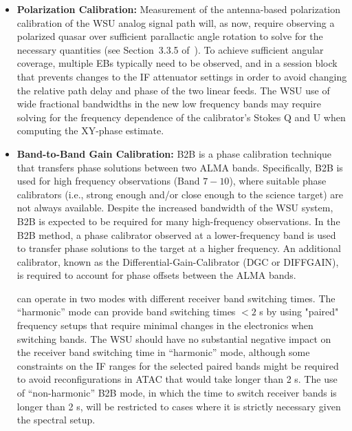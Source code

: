 \begin{itemize}[itemsep=-0.5em]
The flux service, which estimates the source flux density, spectral index and curvature at a time and frequency given the measurements, will continue to be an essential component of ALMA in the WSU. The resulting flux calibration will be linear with respect to the flux scaling to allow for the re-scaling of the fluxes for individual EBs prior to imaging, as necessary. This will allow the per-EB calibration to be run as close as possible to the time the data were acquired, later re-scaling the fluxes, if necessary, either because the  Source Catalogue values changed or to equalize the flux between EBs.
Spectral windows with wider fractional bandwidth enabled by the WSU will need improved treatment in the Pipeline of the spectral curvature of the grid calibrators, to  maintain the accuracy of the flux scale. 
\item{\bf Polarization Calibration:} Measurement of the antenna-based polarization calibration of the WSU analog signal path will, as now, require observing a polarized quasar over sufficient parallactic angle rotation to solve for the necessary quantities (see Section~3.3.5 of~\cite{CSA-IA}).  To achieve sufficient angular coverage, multiple EBs typically need to be observed, and in a session block that prevents changes to the IF attenuator settings in order to avoid changing the relative path delay and phase of the two linear feeds.  The WSU use of wide
fractional bandwidths in the new low frequency bands may require solving for the frequency dependence of the calibrator’s Stokes Q and U when computing the XY-phase estimate.
\item{\bf Band-to-Band Gain Calibration:} \ac{B2B} is a phase calibration technique that transfers phase solutions between two ALMA bands. Specifically, B2B is used for high frequency observations (Band $7-10$), where suitable phase calibrators (i.e., strong enough and/or close enough to the science target) are not always available. Despite the increased bandwidth of the WSU system, B2B is expected to be required for many high-frequency observations. In the B2B method, a phase calibrator observed at a lower-frequency band is used to transfer phase solutions to the target at a higher frequency.  An additional calibrator, known as the Differential-Gain-Calibrator (DGC or DIFFGAIN), is required to account for  phase offsets between the ALMA bands. 

 can operate in two modes with different receiver band switching times. The “harmonic” mode can provide band switching times $<2$ s by using "paired" frequency setups that require minimal changes in the electronics when switching bands. The WSU should have no substantial negative impact on the receiver band switching time in “harmonic” mode, although some constraints on the IF ranges for the selected paired bands might be required to avoid reconfigurations in ATAC that would take longer than 2 s. The use of “non-harmonic” B2B mode, in which the time to switch receiver bands is longer than 2 s, will be restricted to cases where it is strictly necessary given the spectral setup.
\end{itemize}
